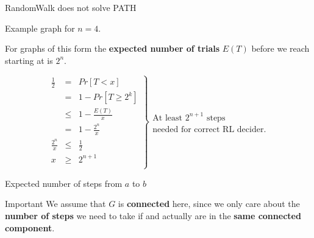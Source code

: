 \begin{frame}{RandomWalk does not solve PATH}

Example graph for $n=4$.

\begin{center}
\end{center}

For graphs of this form the \textbf{expected number of trials} $E(T)$
before we reach  starting at  is $2^{n}$.

\[
\left.
\begin{array}{rcl}
\frac{1}{2} & = & Pr[T < x] \\
            & = & 1 - Pr[T \geq 2^k] \\
            & \leq & 1 - \frac{E(T)}{x} \\
            & = & 1 - \frac{2^n}{x} \\
\frac{2^n}{x} & \leq & \frac{1}{2} \\
x & \geq & 2^{n+1} \\
\end{array}
\right\}
\begin{array}{l}
\text{At least } 2^{n+1} \text{ steps}\\
\text{needed for correct RL decider.}
\end{array}
\]

\end{frame}

\begin{frame}{Expected number of steps from $a$ to $b$}

\begin{block}{Important}
We assume that $G$ is \textbf{connected} here, since we only care about
the \textbf{number of steps} we need to take if  and 
actually are in the \textbf{same connected component}.
\end{block}

\end{frame}

